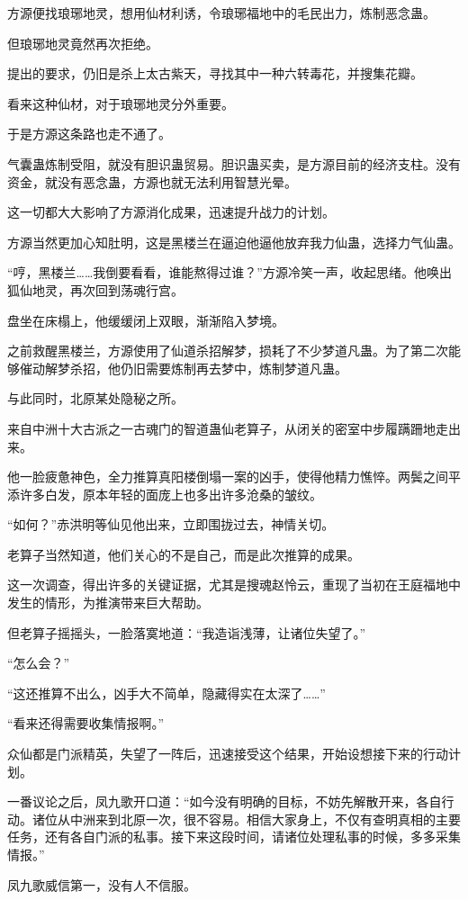 \begin{this_body}
方源便找琅琊地灵，想用仙材利诱，令琅琊福地中的毛民出力，炼制恶念蛊。

但琅琊地灵竟然再次拒绝。

提出的要求，仍旧是杀上太古紫天，寻找其中一种六转毒花，并搜集花瓣。

看来这种仙材，对于琅琊地灵分外重要。

于是方源这条路也走不通了。

气囊蛊炼制受阻，就没有胆识蛊贸易。胆识蛊买卖，是方源目前的经济支柱。没有资金，就没有恶念蛊，方源也就无法利用智慧光晕。

这一切都大大影响了方源消化成果，迅速提升战力的计划。

方源当然更加心知肚明，这是黑楼兰在逼迫他逼他放弃我力仙蛊，选择力气仙蛊。

“哼，黑楼兰……我倒要看看，谁能熬得过谁？”方源冷笑一声，收起思绪。他唤出狐仙地灵，再次回到荡魂行宫。

盘坐在床榻上，他缓缓闭上双眼，渐渐陷入梦境。

之前救醒黑楼兰，方源使用了仙道杀招解梦，损耗了不少梦道凡蛊。为了第二次能够催动解梦杀招，他仍旧需要炼制再去梦中，炼制梦道凡蛊。

与此同时，北原某处隐秘之所。

来自中洲十大古派之一古魂门的智道蛊仙老算子，从闭关的密室中步履蹒跚地走出来。

他一脸疲惫神色，全力推算真阳楼倒塌一案的凶手，使得他精力憔悴。两鬓之间平添许多白发，原本年轻的面庞上也多出许多沧桑的皱纹。

“如何？”赤洪明等仙见他出来，立即围拢过去，神情关切。

老算子当然知道，他们关心的不是自己，而是此次推算的成果。

这一次调查，得出许多的关键证据，尤其是搜魂赵怜云，重现了当初在王庭福地中发生的情形，为推演带来巨大帮助。

但老算子摇摇头，一脸落寞地道：“我造诣浅薄，让诸位失望了。”

“怎么会？”

“这还推算不出么，凶手大不简单，隐藏得实在太深了……”

“看来还得需要收集情报啊。”

众仙都是门派精英，失望了一阵后，迅速接受这个结果，开始设想接下来的行动计划。

一番议论之后，凤九歌开口道：“如今没有明确的目标，不妨先解散开来，各自行动。诸位从中洲来到北原一次，很不容易。相信大家身上，不仅有查明真相的主要任务，还有各自门派的私事。接下来这段时间，请诸位处理私事的时候，多多采集情报。”

凤九歌威信第一，没有人不信服。


\end{this_body}

